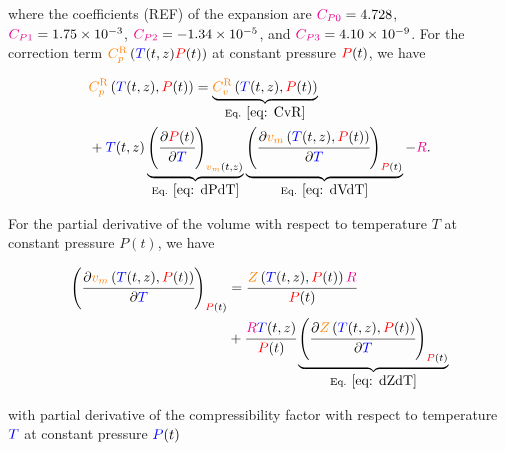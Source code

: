 \documentclass[../Article_Model_Parameters.tex]{subfiles}
\begin{document}
	where the coefficients ({\color{red}REF}) of the expansion are ${\color{magenta}C_{P0}} = 4.728$, ${\color{magenta}C_{P1}} = 1.75 \times 10^{-3}$, ${\color{magenta}C_{P2}} = -1.34 \times 10^{-5}$, and ${\color{magenta}C_{P3}} = 4.10 \times 10^{-9}$. For the correction term ${\color{orange}C_p^{\text{R}}}\left({\color{blue}T}(t,z){\color{red}P}(t)\right)$ at constant pressure ${\color{red}P}(t)$, we have
	
	{\footnotesize	
	\begin{align}
		&{\color{orange}C_p^{\text{R}}}\left({\color{blue}T}(t,z), {\color{red}P}(t)\right) = \underbrace{{\color{orange}C_v^{\text{R}}}\left({\color{blue}T}(t,z), {\color{red}P}(t)\right)}_{\text{Eq. }\eqref{eq: CvR}} \nonumber \\
		&+ {\color{blue}T}(t,z) \underbrace{\left(\cfrac{\partial {\color{red}P}(t)}{\partial {\color{blue}T}}\right)_{{\color{orange}v_m}(t,z)}}_{\text{Eq. } \eqref{eq: dPdT}} \underbrace{\left(\cfrac{\partial {\color{orange}v_m}\left({\color{blue}T}(t,z),{\color{red}P}(t)\right)}{\partial {\color{blue}T}}\right)_{{\color{red}P}(t)}}_{\text{Eq. } \eqref{eq: dVdT}} - {\color{magenta}R}. \label{eq: Cp_R} 
	\end{align} }

	
	For the partial derivative of the volume with respect to temperature $T$ at constant pressure $P(t)$, we have

	{\footnotesize
	\begin{align}
		\left( \cfrac{\partial {\color{orange}v_m}\left({\color{blue}T}(t,z), {\color{red}P}(t)\right)}{\partial {\color{blue}T}} \right)_{{\color{red}P}(t)} &= \cfrac{{\color{orange}Z}\left({\color{blue}T}(t,z), {\color{red}P}(t)\right) {\color{magenta}R}}{{\color{red}P}(t)} \nonumber \\
		&+ \cfrac{{\color{magenta}R}{\color{blue}T}(t,z)}{{\color{red}P}(t)} \underbrace{\left( \cfrac{\partial {\color{orange}Z}\left({\color{blue}T}(t,z), {\color{red}P}(t)\right)}{\partial {\color{blue}T}} \right)_{{\color{red}P}(t)}}_{\text{Eq. }\eqref{eq: dZdT}} \label{eq: dVdT}
	\end{align} }
 
	with partial derivative of the compressibility factor with respect to temperature ${\color{blue}T}$ at constant pressure ${\color{blue}P}(t)$
\end{document}
